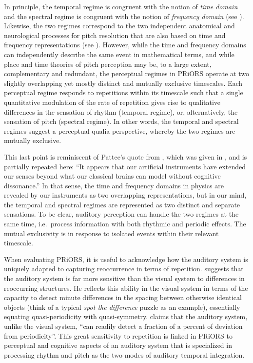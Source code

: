 In principle, the temporal regime is congruent with the notion of \emph{time domain} and the spectral regime is congruent with the notion of \emph{frequency domain} (see ).
Likewise, the two regimes correspond to the two independent anatomical and neurological processes for pitch resolution that are also based on time and frequency representations (see ).
However, while the time and frequency domains can independently describe the same event in mathematical terms, and while place and time theories of pitch perception may be, to a large extent, complementary and redundant, the perceptual regimes in PRiORS operate at two slightly overlapping yet mostly distinct and mutually exclusive timescales.
Each perceptual regime responds to repetitions within its timescale such that a single quantitative modulation of the rate of repetition gives rise to qualitative differences in the sensation of rhythm (temporal regime), or, alternatively, the sensation of pitch (spectral regime).
In other words, the temporal and spectral regimes suggest a perceptual qualia perspective, whereby the two regimes are mutually exclusive.

This last point is reminiscent of Pattee's quote from \citet[21]{pattee2012lawssk}, which was given in , and is partially repeated here:
\enquote{It appears that our artificial instruments have extended our senses beyond what our classical brains can model without cognitive dissonance.}
In that sense, the time and frequency domains in physics are revealed by our instruments as two overlapping representations, but in our mind, the temporal and spectral regimes are represented as two distinct and separate sensations.
To be clear, auditory perception can handle the two regimes at the same time, i.e.~process information with both rhythmic and periodic effects. The mutual exclusivity is in response to isolated events within their relevant timescale.

When evaluating PRiORS, it is useful to acknowledge how the auditory system is uniquely adapted to capturing reoccurrence in terms of repetition. \citet{chowning2001perceptual} suggests that the auditory system is far more sensitive than the visual system to differences in reoccurring structures. He reflects this ability in the visual system in terms of the capacity to detect minute differences in the spacing between otherwise identical objects (think of a typical \emph{spot the difference} puzzle as an example), essentially equating quasi-periodicity with quasi-symmetry.
\citet[267]{chowning2001perceptual} claims that the auditory system, unlike the visual system, \enquote{can readily detect a fraction of a percent of deviation from periodicity}.
This great sensitivity to repetition is linked in PRiORS to perceptual and cognitive aspects of an auditory system that is specialized in processing rhythm and pitch
as the two modes of auditory temporal integration.

